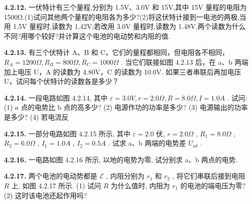 \begin{center}
\end{center}

\vfill
\newpage

\textbf{4.2.12.} 一伏特计有三个量程,分别为 1.5V、3.0V 和 15V,其中 15V 量程的电阻为 1500Ω.(1)试问其他两个量程的电阻各为多少?(2)将这伏特计接到一电池的两极,当用 1.5V 量程时,读数为 1.42V;若改用 3.0V 量程时,读数为 1.48V.两个读数为什么不同?用哪个较好?并计算这个电池的电动势和内阻的值.

\vfill
\newpage

\textbf{4.2.13.} 有三个伏特计 A、B 和 C，它们的量程都相同，但电阻各不相同， $R_{A}=1200\Omega, R_{B}=800\Omega, R_{C}=1000\Omega$ . 当它们联接如图 4.2.13 后，在 a、b 两端加上电压 U，A 的读数为 4.80V，C 的读数为 10.0V. 如果三者串联后再加电压 U，试问每个伏特计的读数各是多少？

\begin{center}
\end{center}

\vfill
\newpage

\textbf{4.2.14.} 一段电路如图 4.2.14, 其中 $\varepsilon = 3.0V, r = 2.0\Omega, R = 8.0\Omega, I = 1.0A$ . 试问: (1) $a$ 点的电势比 b 点的高多少? (2) 电源作功的功率是多少? (3) 电源输出的功率是多少? (4) 若电流反

\begin{center}
\end{center}

\vfill
\newpage

\textbf{4.2.15.} 一部分电路如图 4.2.15 所示, 其中 $\varepsilon = 2.0$ 伏, $r = 2.0\Omega$ , $R_{1} = 8.0\Omega$ , $R_{2} = 6.0\Omega$ , $I_{1} = 1.0A$ , $I_{2} = 0.5A$ . 试求 a、b 两端的电势差 $U_{ab}$ .

\begin{center}
\end{center}

\vfill
\newpage

\textbf{4.2.16.} 一电路如图 4.2.16 所示, 以地的电势为零, 试分别求 a、b 两点的电势.

\vfill
\newpage

\textbf{4.2.17.} 两个电池的电动势都是 $\mathcal{E}$ , 内阻分别为 $r_1$ 和 $r_2$ , 将它们串联后接到电阻 $R$ 上, 如图 4.2.17 所示. (1) 试问 $R$ 为什么值时, 内阻为 $r_1$ 的电池的端电压为零? (2) 这时该电池还起作用吗?

